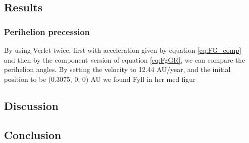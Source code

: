 \documentclass{article}
\newcommand{\husk}[1]{\color{red} #1 \color{black}}
\begin{document}
\subsection{Results}
\subsubsection*{Perihelion precession}
By using Verlet twice, first with acceleration given by equation \eqref{eq:FG_comp} and then by the component version of equation \eqref{eq:FgGR}, we can compare the perihelion angles. By setting the velocity to 12.44 AU/year, and the initial position to be (0.3075, 0, 0) AU we found \husk{Fyll in her med figur}
\subsection{Discussion}
\subsection{Conclusion}
\end{document}
